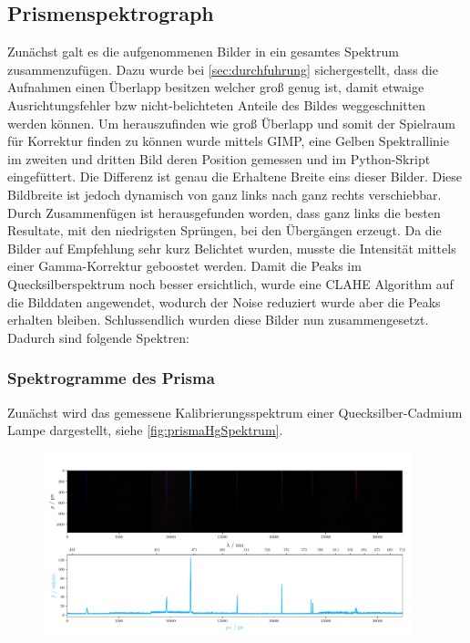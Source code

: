 \documentclass[12pt,english,ngerman]{scrartcl}
\begin{document}
\subsection{Prismenspektrograph}
Zunächst galt es die aufgenommenen Bilder in ein gesamtes Spektrum
zusammenzufügen. Dazu wurde bei \autoref{sec:durchfuhrung} sichergestellt, dass
die Aufnahmen einen Überlapp besitzen welcher groß genug ist, damit etwaige
Ausrichtungsfehler bzw nicht-belichteten Anteile des Bildes weggeschnitten
werden können. Um herauszufinden wie groß Überlapp und somit der Spielraum für
Korrektur finden zu können wurde mittels GIMP, eine Gelben Spektrallinie im
zweiten und dritten Bild deren Position gemessen und im Python-Skript
eingefüttert. Die Differenz ist genau die Erhaltene Breite eins dieser Bilder.
Diese Bildbreite ist jedoch dynamisch von ganz links nach ganz rechts
verschiebbar. Durch Zusammenfügen ist herausgefunden worden, dass ganz links
die besten Resultate, mit den niedrigsten Sprüngen, bei den Übergängen erzeugt.
Da die Bilder auf Empfehlung sehr kurz Belichtet wurden, musste die Intensität
mittels einer Gamma-Korrektur geboostet werden. Damit die Peaks im
Quecksilberspektrum noch besser ersichtlich, wurde eine CLAHE Algorithm auf die
Bilddaten angewendet, wodurch der Noise reduziert wurde aber die Peaks erhalten
bleiben. Schlussendlich wurden diese Bilder nun zusammengesetzt. Dadurch sind
folgende Spektren:

\subsubsection{Spektrogramme des Prisma}
Zunächst wird das gemessene Kalibrierungsspektrum einer Quecksilber-Cadmium
Lampe dargestellt, siehe \autoref{fig:prismaHgSpektrum}.

\begin{figure}[H]
	\begin{center}
		\includegraphics[width=0.95\textwidth]{figures/Hg_plot.pdf}
	\end{center}
	\caption{}\label{fig:prismaHgSpektrum}
\end{figure}
\end{document}
